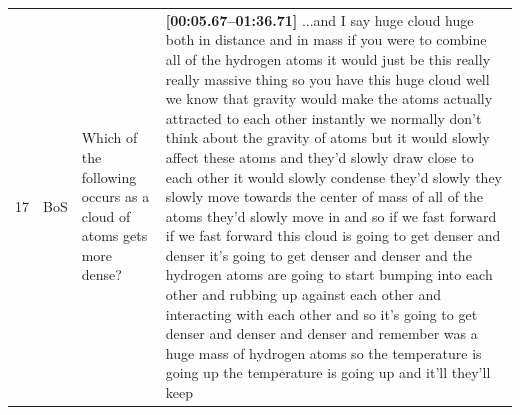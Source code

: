 \documentclass[10pt]{article}
\begin{document}
\begin{tiny}
\begin{longtable}{|r|p{0.375in}|p{1.275in}|p{3.5in}|}
17 &          BoS &                                                                                                                                                                                                               Which of the following occurs as a cloud of atoms gets more dense? &                                                                                                                                                                                                                                                                                                                                                                                                                                                                                                                                                                                                                                                                                                                                                                                                                                                                                                                                                                                                                                                                                                                                                                                                                                                                                                                                                                                                                                                                                                                                                                                                                                                                                                                                                                                                                                                                                                                                                                                                                                             \textbf{[00:05.67--01:36.71]} ...and I say huge cloud huge both in distance and in mass if you were to combine all of the hydrogen atoms it would just be this really really massive thing so you have this huge cloud well we know that gravity would make the atoms actually attracted to each other instantly we normally don't think about the gravity of atoms but it would slowly affect these atoms and they'd slowly draw close to each other it would slowly condense they'd slowly they slowly move towards the center of mass of all of the atoms they'd slowly move in and so if we fast forward if we fast forward this cloud is going to get denser and denser it's going to get denser and denser and the hydrogen atoms are going to start bumping into each other and rubbing up against each other and interacting with each other and so it's going to get denser and denser and denser and remember was a huge mass of hydrogen atoms so the temperature is going up the temperature is going up and it'll they'll keep 
\end{longtable}
\end{tiny}
\end{document}
